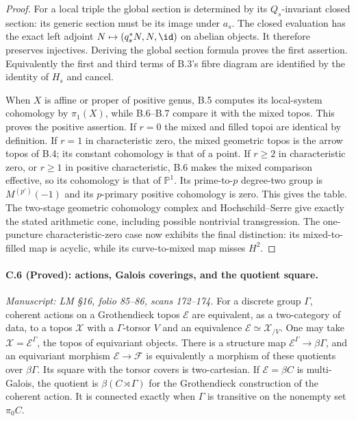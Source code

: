 \begin{proof}
For a local triple the global section is determined
by its $Q_s$-invariant closed section: its generic
section must be its image under $a_s$. The
closed evaluation has the exact left adjoint
$N\mapsto(q_s^*N,N,\id)$ on abelian objects.
It therefore preserves injectives. Deriving
the global section formula proves the first
assertion. Equivalently the first and third
terms of B.3's fibre diagram are identified
by the identity of $H_s$ and cancel.

When $X$ is affine or proper of positive genus,
B.5 computes its local-system cohomology by
$\pi_1(X)$, while B.6--B.7 compare it with
the mixed topos. This proves the positive
assertion. If $r=0$ the mixed and filled topoi
are identical by definition. If $r=1$ in
characteristic zero, the mixed geometric
topos is the arrow topos of B.4; its constant
cohomology is that of a point. If $r\geq2$
in characteristic zero, or $r\geq1$ in
positive characteristic, B.6 makes the mixed
comparison effective, so its cohomology is
that of $\mathbb P^1$. Its prime-to-$p$
degree-two group is $M^{(p')}(-1)$ and its
$p$-primary positive cohomology is zero.
This gives the table. The two-stage geometric
cohomology complex and Hochschild--Serre
give exactly the stated arithmetic cone,
including possible nontrivial transgression.
The one-puncture characteristic-zero case
now exhibits the final distinction: its
mixed-to-filled map is acyclic, while its
curve-to-mixed map misses $H^2$.
\end{proof}

\paragraph{C.6 (Proved): actions, Galois coverings, and the quotient square.}\label{C6}
\textit{Manuscript: LM \S16, folio 85--86, scans 172--174.}
For a discrete group $\Gamma$, coherent actions on
a Grothendieck topos $\mathcal E$ are equivalent,
as a two-category of data, to a topos $\mathcal X$
with a $\Gamma$-torsor $V$ and an equivalence
$\mathcal E\simeq\mathcal X_{/V}$.
One may take $\mathcal X=\mathcal E^\Gamma$, the
topos of equivariant objects. There is a
structure map $\mathcal E^\Gamma\to\beta\Gamma$,
and an equivariant morphism $\mathcal E\to\mathcal F$
is equivalently a morphism of these quotients
over $\beta\Gamma$. Its square with the torsor
covers is two-cartesian. If $\mathcal E=\beta C$
is multi-Galois, the quotient is
$\beta(C\rtimes\Gamma)$ for the Grothendieck
construction of the coherent action. It is
connected exactly when $\Gamma$ is transitive
on the nonempty set $\pi_0C$.

